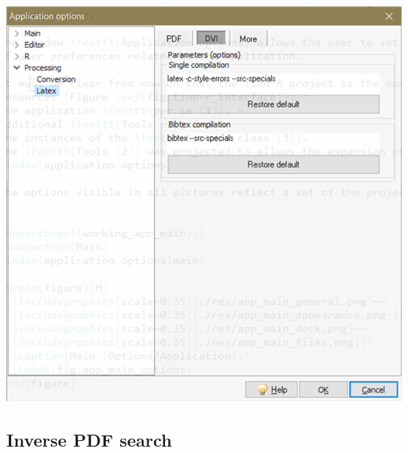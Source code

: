 \begin{itemize}
\begin{itemize}
        \includegraphics[scale=0.50]{./res/app_processing_latex_dvi.png}\\
    \end{itemize}
\end{itemize}


\subsection{Inverse PDF search}

